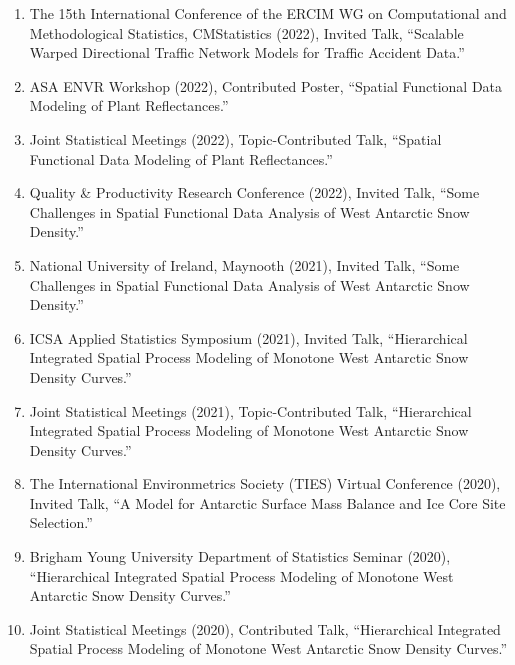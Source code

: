 \documentclass[11pt]{article}
\begin{document}
\begin{enumerate}[label=$\bullet$]

\item The 15th International Conference of the ERCIM WG on Computational and Methodological Statistics, CMStatistics (2022), Invited Talk, ``Scalable Warped Directional Traffic Network Models for Traffic Accident Data.''


\item ASA ENVR Workshop (2022), Contributed Poster, ``Spatial Functional Data Modeling of Plant Reflectances.''

\item Joint Statistical Meetings (2022), Topic-Contributed Talk, ``Spatial Functional Data Modeling of Plant Reflectances.''

\item Quality \& Productivity Research Conference (2022), Invited Talk, ``Some Challenges in Spatial Functional Data Analysis of West Antarctic Snow Density.''

\item National University of Ireland, Maynooth (2021), Invited Talk, ``Some Challenges in Spatial Functional Data Analysis of West Antarctic Snow Density.''

\item ICSA Applied Statistics Symposium (2021), Invited Talk, ``Hierarchical Integrated Spatial Process Modeling of Monotone West Antarctic Snow Density Curves.''

\item Joint Statistical Meetings (2021), Topic-Contributed Talk, ``Hierarchical Integrated Spatial Process Modeling of Monotone West Antarctic Snow Density Curves.''

\item The International Environmetrics Society (TIES) Virtual Conference (2020), Invited Talk, ``A Model for Antarctic Surface Mass Balance and Ice Core Site Selection.''
\item Brigham Young University Department of Statistics Seminar (2020), ``Hierarchical Integrated Spatial Process Modeling of Monotone West Antarctic Snow Density Curves.''
\item Joint Statistical Meetings (2020), Contributed Talk, ``Hierarchical Integrated Spatial Process Modeling of Monotone West Antarctic Snow Density Curves.''


\end{enumerate}
\end{document}
